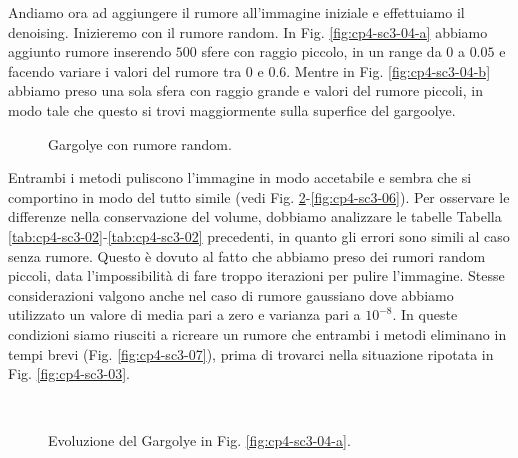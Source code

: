 Andiamo ora ad aggiungere il rumore all'immagine iniziale e
effettuiamo il denoising. Inizieremo con il rumore random. In
Fig. \ref{fig:cp4-sc3-04-a} abbiamo aggiunto rumore inserendo
$500$ sfere con raggio piccolo, in un range da $0$ a $0.05$ e facendo
variare i valori del rumore tra $0$ e $0.6$. Mentre in
Fig. \ref{fig:cp4-sc3-04-b} abbiamo preso una sola sfera con
raggio grande e valori del rumore piccoli, in modo tale che questo si trovi maggiormente sulla superfice del gargoolye. 

\begin{figure}[h!tb]
  \centering
  \quad
  \quad
  \caption{Gargolye con rumore random.}
  \label{fig:cp4-sc3-04}
\end{figure}

Entrambi i metodi puliscono l'immagine in modo accetabile e sembra
che si comportino in modo del tutto simile (vedi
Fig. \ref{fig:cp4-sc3-05}-\ref{fig:cp4-sc3-06}). Per osservare le
differenze nella conservazione del volume, dobbiamo analizzare le tabelle
Tabella \ref{tab:cp4-sc3-02}-\ref{tab:cp4-sc3-02} precedenti, in
quanto gli errori sono simili al caso senza rumore. Questo è dovuto al
fatto che abbiamo preso dei rumori random piccoli, data
l'impossibilità di fare troppo iterazioni per pulire
l'immagine. Stesse considerazioni valgono anche nel caso di rumore
gaussiano dove abbiamo utilizzato un valore di media pari a zero e
varianza pari a $10^{-8}$. In queste condizioni siamo riusciti a
ricreare un rumore che entrambi i metodi eliminano in tempi brevi
(Fig. \ref{fig:cp4-sc3-07}), prima di trovarci nella situazione ripotata in
Fig. \ref{fig:cp4-sc3-03}. 

\begin{figure}[h!tb]
  \centering
  \quad
  \\
  \quad
  \caption{Evoluzione del Gargolye in Fig. \ref{fig:cp4-sc3-04-a}.}
  \label{fig:cp4-sc3-05}
\end{figure} 

